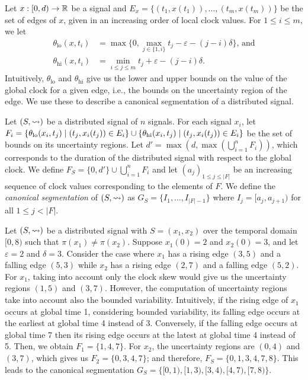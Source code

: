 Let $x : [0,d) \to \mathbb{R}$ be a signal and $E_x = \{(t_1, x(t_1)), \ldots, (t_m, x(t_m))\}$ be the set of edges of $x$, given in an increasing order of local clock values.
For $1 \leq i \leq m$, we let 
\begin{align*}
	\theta_{\text{lo}}(x,t_i) &= \max\{0, \max_{j \in \{1, i\}} t_j - \varepsilon - (j-i)\delta\} \text{, and} \\
	\theta_{\text{hi}}(x,t_i) &= \min_{i \leq j \leq m} t_j + \varepsilon - (j-i)\delta.
\end{align*}
Intuitively, $\theta_{\text{lo}}$ and $\theta_{\text{hi}}$ give us the lower and upper bounds on the value of the global clock for a given edge, i.e., the bounds on the uncertainty region of the edge.
We use these to describe a canonical segmentation of a distributed signal.

Let $(S,{\rightsquigarrow})$ be a distributed signal of $n$ signals.
For each signal $x_i$, let $F_i = \{\theta_{\text{lo}}(x_i, t_j) \st (t_j, x_i(t_j)) \in E_i\} \cup \{\theta_{\text{hi}}(x_i, t_j) \st (t_j, x_i(t_j)) \in E_i \}$ be the set of bounds on its uncertainty regions.
Let $d' = \max(d, \max (\bigcup_{i = 1}^{n} F_i))$, which corresponds to the duration of the distributed signal with respect to the global clock.
We define $F_S = \{0, d'\} \cup \bigcup_{i = 1}^{n} F_i$ and let $(a_j)_{1 \leq j \leq |F|}$ be an increasing sequence of clock values corresponding to the elements of $F$.
We define the \emph{canonical segmentation} of $(S,{\rightsquigarrow})$ as $G_S = \{I_1, \ldots, I_{|F| - 1}\}$ where $I_j = [a_j, a_{j+1})$ for all $1 \leq j < |F|$.

\begin{example} \label{ex:canonseg}
	Let $(S, {\rightsquigarrow})$ be a distributed signal with $S = (x_1, x_2)$ over the temporal domain $[0,8)$ such that $\pi(x_1) \neq \pi(x_2)$.
	Suppose $x_1(0) = 2$ and $x_2(0) = 3$, and let $\varepsilon = 2$ and $\delta = 3$.	
	Consider the case where $x_1$ has a rising edge $(3,5)$ and a falling edge $(5,3)$ while $x_2$ has a rising edge $(2,7)$ and a falling edge $(5,2)$.
	For $x_1$, taking into account only the clock skew would give us the uncertainty regions $(1,5)$ and $(3,7)$.
	However, the computation of uncertainty regions take into account also the bounded variability.
	Intuitively, if the rising edge of $x_1$ occurs at global time 1, considering bounded variability, its falling edge occurs at the earliest at global time 4 instead of 3.
	Conversely, if the falling edge occurs at global time 7 then its rising edge occurs at the latest at global time 4 instead of 5.
	Then, we obtain $F_1 = \{1, 4, 7\}$.
	For $x_2$, the uncertainty regions are $(0,4)$ and $(3,7)$, which gives us $F_2 = \{0, 3, 4, 7\}$; and therefore, $F_S = \{0, 1, 3, 4, 7, 8\}$.
	This leads to the canonical segmentation $G_S = \{[0,1), [1,3) ,[3,4) ,[4,7) ,[7,8)\}$.		
\end{example}

